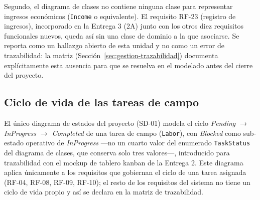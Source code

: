 Segundo, el diagrama de clases no contiene ninguna clase para representar ingresos económicos
(\texttt{Income} o equivalente). El requisito RF-23 (registro de ingresos), incorporado en la
Entrega 3 (2A) junto con los otros diez requisitos funcionales nuevos, queda así sin una clase de
dominio a la que asociarse. Se reporta como un hallazgo abierto de esta unidad y no como un error
de trazabilidad: la matriz (Sección~\ref{sec:gestion-trazabilidad}) documenta explícitamente esta
ausencia para que se resuelva en el modelado antes del cierre del proyecto.

\subsection{Ciclo de vida de las tareas de campo}
\label{sec:sd01-interpretacion}

El único diagrama de estados del proyecto (SD-01) modela el ciclo \emph{Pending
$\rightarrow$ InProgress $\rightarrow$ Completed} de una tarea de campo (\texttt{Labor}), con
\emph{Blocked} como sub-estado operativo de \emph{InProgress} —no un cuarto valor del enumerado
\texttt{TaskStatus} del diagrama de clases, que conserva solo tres valores—, introducido para
trazabilidad con el mockup de tablero kanban de la Entrega 2. Este diagrama aplica únicamente a
los requisitos que gobiernan el ciclo de una tarea asignada (RF-04, RF-08, RF-09, RF-10); el resto
de los requisitos del sistema no tiene un ciclo de vida propio y así se declara en la matriz de
trazabilidad.
